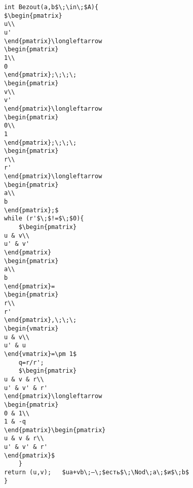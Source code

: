 \begin{framed}

\begin{lstlisting}[frame=none, mathescape=true, caption=Алгоритм Безу для квазиевклидова кольца]
int Bezout(a,b$\;\in\;$A){
$\begin{pmatrix}
u\\
u'
\end{pmatrix}\longleftarrow
\begin{pmatrix}
1\\
0
\end{pmatrix};\;\;\;
\begin{pmatrix}
v\\
v'
\end{pmatrix}\longleftarrow
\begin{pmatrix}
0\\
1
\end{pmatrix};\;\;\;
\begin{pmatrix}
r\\
r'
\end{pmatrix}\longleftarrow
\begin{pmatrix}
a\\
b
\end{pmatrix};$
while (r'$\;$!=$\;$0){
	$\begin{pmatrix}
u & v\\
u' & v'
\end{pmatrix}
\begin{pmatrix}
a\\
b
\end{pmatrix}=
\begin{pmatrix}
r\\
r'
\end{pmatrix},\;\;\;
\begin{vmatrix}
u & v\\
u' & u
\end{vmatrix}=\pm 1$
	q=r/r';
	$\begin{pmatrix}
u & v & r\\
u' & v' & r'
\end{pmatrix}\longleftarrow
\begin{pmatrix}
0 & 1\\
1 & -q
\end{pmatrix}\begin{pmatrix}
u & v & r\\
u' & v' & r'
\end{pmatrix}$
	}
return (u,v);	$ua+vb\;—\;$есть$\;\Nod\;a\;$и$\;b$
}
\end{lstlisting}
\end{framed}

